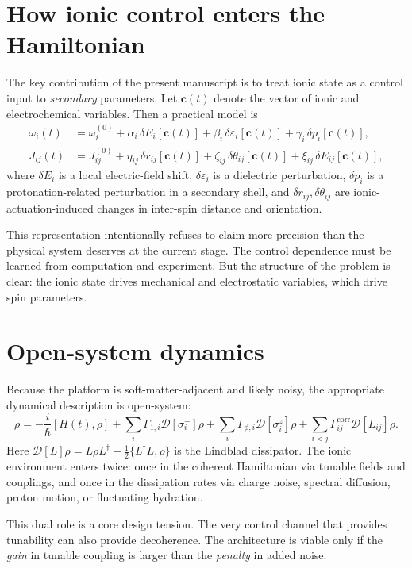 \documentclass[11pt]{report}
\newcommand{\ham}{Hamiltonian}
\theoremstyle{definition}
\begin{document}
\section{How ionic control enters the Hamiltonian}
The key contribution of the present manuscript is to treat ionic state as a control input to \emph{secondary} parameters. Let $\mathbf{c}(t)$ denote the vector of ionic and electrochemical variables. Then a practical model is
\begin{align}
\omega_i(t) &= \omega_i^{(0)} + \alpha_i \, \delta E_i[\mathbf{c}(t)] + \beta_i \, \delta \varepsilon_i[\mathbf{c}(t)] + \gamma_i \, \delta p_i[\mathbf{c}(t)], \\
J_{ij}(t) &= J_{ij}^{(0)} + \eta_{ij}\,\delta r_{ij}[\mathbf{c}(t)] + \zeta_{ij}\,\delta \theta_{ij}[\mathbf{c}(t)] + \xi_{ij}\,\delta E_{ij}[\mathbf{c}(t)],
\end{align}
where $\delta E_i$ is a local electric-field shift, $\delta \varepsilon_i$ is a dielectric perturbation, $\delta p_i$ is a protonation-related perturbation in a secondary shell, and $\delta r_{ij}, \delta\theta_{ij}$ are ionic-actuation-induced changes in inter-spin distance and orientation.

This representation intentionally refuses to claim more precision than the physical system deserves at the current stage. The control dependence must be learned from computation and experiment. But the structure of the problem is clear: the ionic state drives mechanical and electrostatic variables, which drive spin parameters.

\section{Open-system dynamics}
Because the platform is soft-matter-adjacent and likely noisy, the appropriate dynamical description is open-system:
\begin{equation}
\dot{\rho} = -\frac{i}{\hbar}[H(t),\rho]
+ \sum_i \Gamma_{1,i}\mathcal{D}[\sigma_i^-]\rho
+ \sum_i \Gamma_{\phi,i}\mathcal{D}[\sigma_i^z]\rho
+ \sum_{i<j}\Gamma_{ij}^{\mathrm{corr}}\mathcal{D}[L_{ij}]\rho .
\end{equation}
Here $\mathcal{D}[L]\rho = L\rho L^\dagger - \tfrac{1}{2}\{L^\dagger L,\rho\}$ is the Lindblad dissipator. The ionic environment enters twice: once in the coherent \ham{} via tunable fields and couplings, and once in the dissipation rates via charge noise, spectral diffusion, proton motion, or fluctuating hydration.

This dual role is a core design tension. The very control channel that provides tunability can also provide decoherence. The architecture is viable only if the \emph{gain} in tunable coupling is larger than the \emph{penalty} in added noise.
\end{document}
